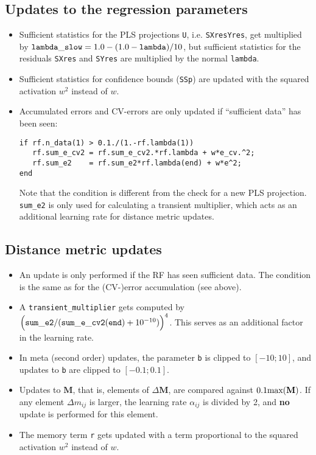 \documentclass[11pt,a4paper]{article}
\newcommand{\mbf}{\mathbf}
\newcommand{\var}[1]{{\tt #1}}
\begin{document}
\subsection{Updates to the regression parameters}
\begin{itemize}
\item Sufficient statistics for the PLS projections \var{U}, i.e. \var{SXresYres},
get multiplied by $\var{lambda\_slow} = 1.0-(1.0-\var{lambda})/10$, but
sufficient statistics for the residuals \var{SXres} and \var{SYres} are
multiplied by the normal \var{lambda}.
\item Sufficient statistics for confidence bounds (\var{SSp}) are
updated with the squared activation $w^2$ instead of $w$. 
\item Accumulated errors and CV-errors are only updated if
``sufficient data'' has been seen:
\begin{verbatim}
if rf.n_data(1) > 0.1./(1.-rf.lambda(1))
   rf.sum_e_cv2 = rf.sum_e_cv2.*rf.lambda + w*e_cv.^2;
   rf.sum_e2    = rf.sum_e2*rf.lambda(end) + w*e^2;
end
\end{verbatim}
Note that the condition is different from the check for a new PLS 
projection. \var{sum\_e2} is only used for calculating a transient
multiplier, which acts as an additional learning rate for distance
metric updates.
\end{itemize}

\subsection{Distance metric updates}
\begin{itemize}
\item An update is only performed if the RF has seen sufficient data.
The condition is the same as for the (CV-)error accumulation (see above).
\item A \var{transient\_multiplier} gets computed by
$\Big(\var{sum\_e2}/(\var{sum\_e\_cv2(end)}+10^{-10})\Big)^4$.
This serves as an additional factor in the learning rate.
\item In meta (second order) updates, the parameter \var{b} is clipped
to $[-10;10]$, and updates to \var{b} are clipped to $[-0.1; 0.1]$.
\item Updates to $\mbf M$, that is, elements of $\Delta\mbf M$, are
compared against $0.1\textnormal{max}(\mbf M)$. If any element 
$\Delta m_{ij}$ is larger, the learning rate $\alpha_{ij}$ is divided by 2,
and \textbf{no} update is performed for this element.
\item The memory term \var{r} gets updated with a term proportional
to the squared activation $w^2$ instead of $w$. 
\end{itemize}
\end{document}
